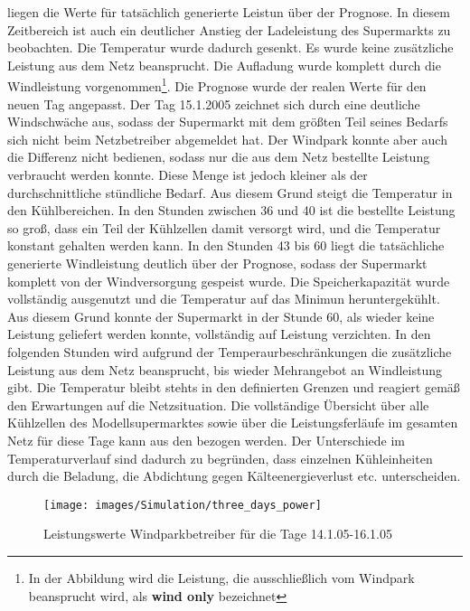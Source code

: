 liegen die Werte f\"ur tats\"achlich generierte Leistun \"uber der Prognose. In
diesem Zeitbereich ist auch ein deutlicher Anstieg der Ladeleistung des
Supermarkts zu beobachten. Die Temperatur wurde dadurch gesenkt. Es wurde keine
zus\"atzliche Leistung aus dem Netz beansprucht. Die Aufladung wurde komplett
durch die Windleistung vorgenommen\footnote{ In der Abbildung wird die
Leistung, die ausschlie\ss lich vom Windpark beansprucht wird, als \textbf{wind
only} bezeichnet}. Die Prognose wurde der realen Werte f\"ur den neuen Tag
angepasst.  Der Tag 15.1.2005 zeichnet sich durch eine deutliche Windschw\"ache
aus, sodass der Supermarkt mit dem gr\"o\ss ten Teil seines Bedarfs sich nicht
beim Netzbetreiber abgemeldet hat. Der Windpark konnte aber auch die Differenz
nicht bedienen, sodass nur die aus dem Netz bestellte Leistung verbraucht werden
konnte. Diese Menge ist jedoch kleiner als der durchschnittliche st\"undliche
Bedarf. Aus diesem Grund steigt die Temperatur in den K\"uhlbereichen. In den
Stunden zwischen 36 und 40 ist die bestellte Leistung so gro\ss ,$ $ dass ein
Teil der K\"uhlzellen damit versorgt wird, und die Temperatur konstant gehalten
werden kann. In den Stunden 43 bis 60 liegt die tats\"achliche generierte
Windleistung deutlich \"uber der Prognose, sodass der Supermarkt komplett von
der Windversorgung gespeist wurde. Die Speicherkapazit\"at wurde vollst\"andig
ausgenutzt und die Temperatur auf das Minimun heruntergek\"uhlt. Aus diesem
Grund konnte der Supermarkt in der Stunde 60, als wieder keine Leistung
geliefert werden konnte, vollst\"andig auf Leistung verzichten. In den folgenden
Stunden wird aufgrund der Temperaurbeschr\"ankungen die zus\"atzliche Leistung
aus dem Netz beansprucht, bis wieder Mehrangebot an Windleistung gibt. Die
Temperatur bleibt stehts in den definierten Grenzen und reagiert gem\"a\ss $ $
den Erwartungen auf die Netzsituation. Die vollst\"andige \"Ubersicht \"uber
alle K\"uhlzellen des Modellsupermarktes sowie \"uber die Leistungsferl\"aufe im
gesamten Netz f\"ur diese Tage kann aus den 
bezogen werden. Der Unterschiede im Temperaturverlauf sind dadurch zu
begr\"unden, dass einzelnen K\"uhleinheiten durch die Beladung, die Abdichtung
gegen K\"alteenergieverlust etc. unterscheiden.

\begin{figure}[h] \begin{center}
\texttt{[image: images/Simulation/three\_days\_power]} \end{center}
\vspace{-25pt} \caption{Leistungswerte Windparkbetreiber f\"ur die Tage
14.1.05-16.1.05} \label{fig:threep} \end{figure}

